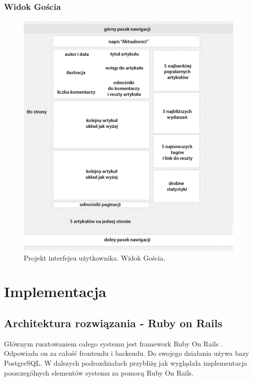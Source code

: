 \documentclass[openright]{xmgr}
\begin{document}
\newpage

\subsection{Widok Gościa}
\begin{figure}[!tbh]
\centering
\includegraphics[width=.9\linewidth]{fig/gui_guest}
\caption{Projekt interfejsu użytkownika. Widok Gościa.}
\end{figure}

\chapter{Implementacja}

\section{Architektura rozwiązania - Ruby on Rails}
Głównym rusztowaniem całego systemu jest framework Ruby On Rails \cite{ror} \cite{enterprise} \cite{wikibook} \cite{guides}. Odpowiada on za całość frontendu i backendu. Do swojego działania używa bazy PostgreSQL. W dalszych podrozdziałach przybliżę jak wyglądała implementacja poszczególnych elementów systemu za pomocą Ruby On Rails.
\end{document}
